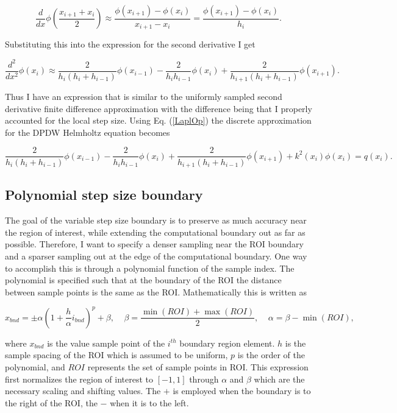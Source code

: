 \documentclass [11 pt, titlepage]{article}
\begin{document}
\begin {displaymath}
\frac {d} {dx} \phi(\frac {x_{i+1} + x_i} {2} ) \approx
\frac {\phi(x_{i+1}) - \phi(x_i)} {x_{i+1} - x_i} =
\frac {\phi(x_{i+1}) - \phi(x_i)} {h_i}.
\end {displaymath}

Substituting this into the expression for the second derivative I get

\begin {equation}
\frac {d^2} {dx^2} \phi({x_i}) \approx 
\frac {2} {h_i(h_i + h_{i-1})} \phi(x_{i-1}) - 
\frac {2} {h_ih_{i-1}} \phi(x_{i}) + 
\frac {2} {h_{i+1}(h_i + h_{i-1})} \phi(x_{i+1}).
\label{LaplOp}
\end {equation}

Thus I have an expression that is similar to the uniformly sampled
second derivative finite difference approximation with the difference
being that I properly accounted for the local step size.  Using
Eq. (\ref{LaplOp}) the discrete approximation for the DPDW Helmholtz
equation becomes

\begin {displaymath}
    \frac {2} {h_i(h_i + h_{i-1})} \phi(x_{i-1}) - 
    \frac {2} {h_ih_{i-1}} \phi(x_{i}) + 
    \frac {2} {h_{i+1}(h_i + h_{i-1})} \phi(x_{i+1}) +
    k^2(x_i) \phi(x_i) = q(x_i).
\end {displaymath}

\subsection{Polynomial step size boundary}
\vspace {-4ex}
The goal of the variable step size boundary is to preserve as
much accuracy near the region of interest, while extending the
computational boundary out as far as possible.  Therefore,  I want
to specify a denser sampling near the ROI boundary and a sparser
sampling out at the edge of the computational boundary.  One way to
accomplish this is through a polynomial function of the sample index.
The polynomial is specified such that at the boundary of the ROI the
distance between sample points is the same as the ROI.  Mathematically
this is written as

\begin {displaymath}
    x_{bnd} = \pm\alpha (1 + \frac {h} {\alpha} i_{bnd})^p + \beta, \;\;\;\;
    \beta = \frac {\min(ROI) + \max(ROI)} {2}, \;\;\;\;
    \alpha = \beta - \min(ROI),
\end {displaymath}

where $x_{bnd}$ is the value sample point of the $i^{th}$ boundary
region element.  $h$ is the sample spacing of the ROI which is assumed
to be uniform, $p$ is the order of the polynomial, and $ROI$
represents the set of sample points in ROI.  This expression first
normalizes the region of interest to $[-1, 1]$ through $\alpha$ and
$\beta$ which are the necessary scaling and shifting values.   The $+$
is employed when the boundary is to the right of the ROI, the $-$ when
it is to the left.
\end{document}
